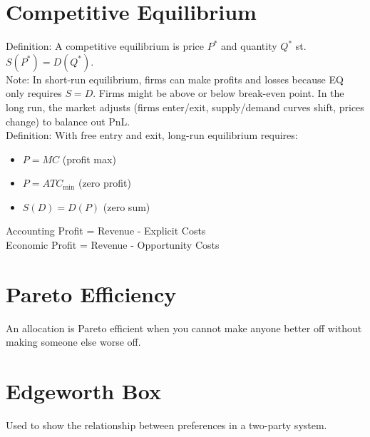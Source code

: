 \documentclass[11pt]{article}
\begin{document}
\section*{Competitive Equilibrium}
Definition: A competitive equilibrium is price $P^*$ and quantity $Q^*$ st. $S(P^*)=D(Q^*)$.\\

Note: In short-run equilibrium, firms can make profits and losses because EQ only requires $S=D$. Firms might be above or below break-even point. In the long run, the market adjusts (firms enter/exit, supply/demand curves shift, prices change) to balance out PnL.\\

Definition: With free entry and exit, long-run equilibrium requires: 
\begin{itemize}
    \item $P=MC$ (profit max)
    \item $P=ATC_{\text{min}}$ (zero profit)
    \item $S(D)=D(P)$ (zero sum)
\end{itemize}

Accounting Profit = Revenue - Explicit Costs\\
Economic Profit = Revenue - Opportunity Costs
\section*{Pareto Efficiency}
An allocation is Pareto efficient when you cannot make anyone better off without making someone else worse off.
\section*{Edgeworth Box}
Used to show the relationship between preferences in a two-party system.
\end{document}
